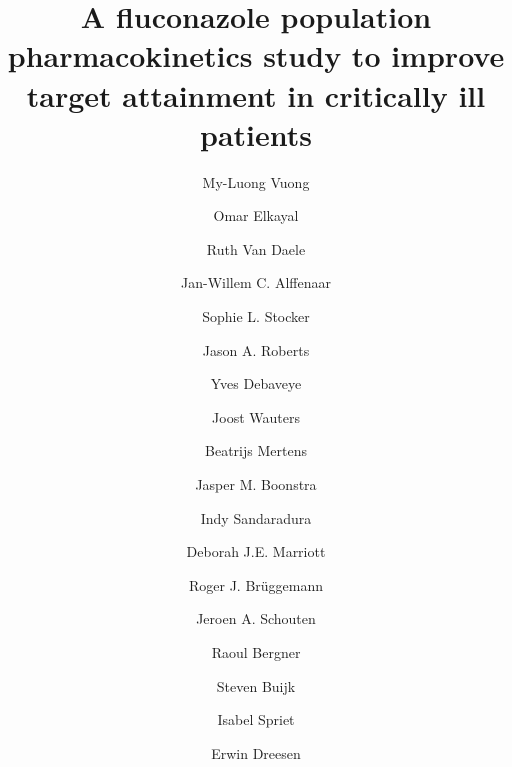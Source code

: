 \documentclass[
  number]{elsarticle}
\begin{document}
\begin{frontmatter}
\title{A fluconazole population pharmacokinetics study to improve target
attainment in critically ill patients}
\author[1]{My-Luong Vuong%
%
}
\author[1]{Omar Elkayal%
%
}
\author[1,2]{Ruth Van Daele%
%
}

\author[3,4,5]{Jan-Willem C. Alffenaar%
%
}

\author[3,5,6,7]{Sophie L. Stocker%
%
}

\author[8,9,10]{Jason A. Roberts%
%
}

\author[11,12]{Yves Debaveye%
%
}

\author[13,12]{Joost Wauters%
%
}

\author[1,2]{Beatrijs Mertens%
%
}

\author[14]{Jasper M. Boonstra%
%
}

\author[15,16,17]{Indy Sandaradura%
%
}

\author[18,19]{Deborah J.E. Marriott%
%
}

\author[20,21]{Roger J. Brüggemann%
%
}

\author[22]{Jeroen A. Schouten%
%
}

\author[23]{Raoul Bergner%
%
}

\author[24]{Steven Buijk%
%
}

\author[2]{Isabel Spriet%
%
}
\author[1]{Erwin Dreesen%
%
}


\end{frontmatter}
\end{document}

